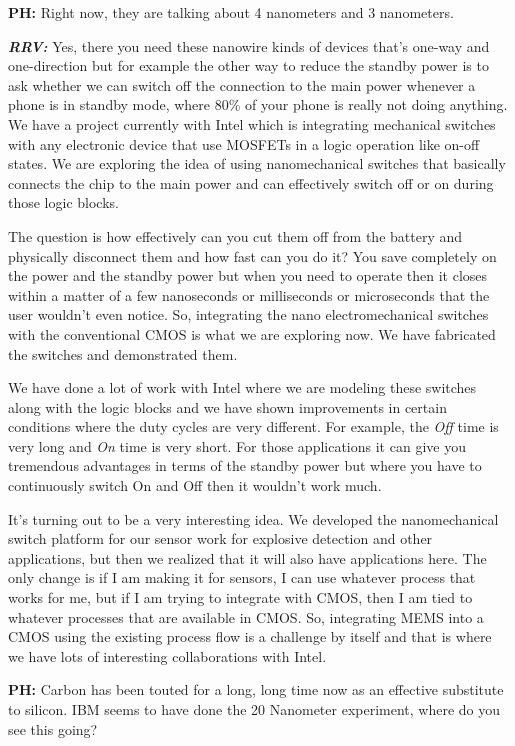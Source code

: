 \textbf{PH:} Right now, they are talking about 4 nanometers and 3 nanometers.

\textbf{\textit{RRV:}} Yes, there you need these nanowire kinds of devices that’s one-way and one-direction but for example the other way to reduce the standby power is to ask whether we can switch off the connection to the main power whenever a phone is in standby mode, where 80\% of your phone is really not doing anything. We have a project currently with Intel which is integrating mechanical switches with any electronic device that use MOSFETs in a logic operation like on-off states. We are exploring the idea of using nanomechanical switches that basically connects the chip to the main power and can effectively switch off or on during those logic blocks.

\newpage

The question is how effectively can you cut them off from the battery and physically disconnect them and how fast can you do it?  You save completely on the power and the standby power but when you need to operate then it closes within a matter of a few nanoseconds or milliseconds or microseconds that the user wouldn’t even notice. So, integrating the nano electromechanical switches with the conventional CMOS is what we are exploring now. We have fabricated the switches and demonstrated them.

We have done a lot of work with Intel where we are modeling these switches along with the logic blocks and we have shown improvements in certain conditions where the duty cycles are very different. For example, the \textit{Off} time is very long and \textit{On} time is very short. For those applications it can give you tremendous advantages in terms of the standby power but where you have to continuously switch On and Off then it wouldn’t work much.

It’s turning out to be a very interesting idea. We developed the nanomechanical switch platform for our sensor work for explosive detection and other applications, but then we realized that it will also have applications here. The only change is if I am making it for sensors, I can use whatever process that works for me, but if I am trying to integrate with CMOS, then I am tied to whatever processes that are available in CMOS. So, integrating MEMS into a CMOS using the existing process flow is a challenge by itself and that is where we have lots of interesting collaborations with Intel.

\textbf{PH:} Carbon has been touted for a long, long time now as an effective substitute to silicon. IBM seems to have done the 20 Nanometer experiment, where do you see this going?

